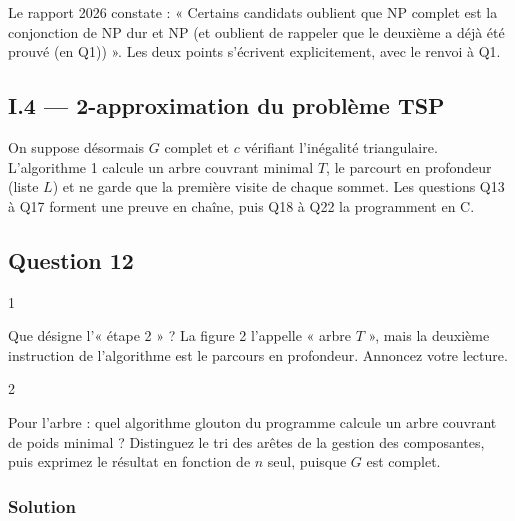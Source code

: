 \documentclass[11pt,a4paper]{article}
\begin{document}
\begin{jury}

Le rapport 2026 constate : « Certains candidats oublient que NP complet est la conjonction de NP dur et NP (et oublient de rappeler que le deuxième a déjà été prouvé (en Q1)) ». Les deux points s'écrivent explicitement, avec le renvoi à Q1.

\end{jury}

\hypertarget{i.4-2-approximation-du-probluxe8me-tsp}{%
\subsection{I.4 --- 2-approximation du problème TSP}\label{i.4-2-approximation-du-probluxe8me-tsp}}

On suppose désormais \(G\) complet et \(c\) vérifiant l'inégalité triangulaire. L'algorithme 1 calcule un arbre couvrant minimal \(T\), le parcourt en profondeur (liste \(L\)) et ne garde que la première visite de chaque sommet. Les questions Q13 à Q17 forment une preuve en chaîne, puis Q18 à Q22 la programment en C.

\hypertarget{question-12}{%
\subsection{Question 12}\label{question-12}}

\begin{indication}{1}

Que désigne l'« étape 2 » ? La figure 2 l'appelle « arbre \(T\) », mais la deuxième instruction de l'algorithme est le parcours en profondeur. Annoncez votre lecture.

\end{indication}

\begin{indication}{2}

Pour l'arbre : quel algorithme glouton du programme calcule un arbre couvrant de poids minimal ? Distinguez le tri des arêtes de la gestion des composantes, puis exprimez le résultat en fonction de \(n\) seul, puisque \(G\) est complet.

\end{indication}

\hypertarget{solution-11}{%
\subsubsection{Solution}\label{solution-11}}
\end{document}
